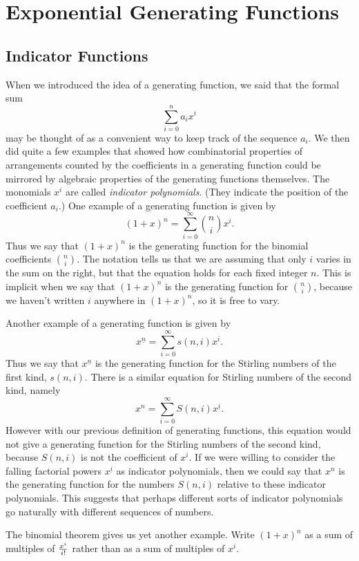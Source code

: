 \chapter{Exponential Generating Functions}\label{expogenfun}
\section{Indicator Functions}
When we introduced the idea of a generating function, we said that the
formal sum
  $$\sum_{i=0}^n a_ix^i$$
may be thought of as a convenient way to keep track of the sequence
$a_i$.  We then did quite a few examples that showed how combinatorial
properties of arrangements counted by the coefficients in a generating
function could be mirrored by algebraic properties of the generating
functions themselves.  The monomials $x^i$ are called {\em indicator
polynomials}.  (They indicate the position of
the coefficient
$a_i$.)  One example of a generating function is given by 
$$(1+x)^n = \sum_{i=0}^\infty {n\choose i}x^i.$$
Thus we say that $(1+x)^n$  is the generating function for the
binomial coefficients $n \choose i$.  The notation tells us that we are
assuming that only $i$ varies in the sum on the right, but that the
equation holds for each fixed integer $n$.  This is implicit when we say
that $(1+x)^n$ is the generating function for $n\choose i$, because we
haven't written $i$ anywhere in $(1+x)^n$, so it is free to vary.

Another example of a generating function is given by
$$x^{\underline{n}} = \sum_{i=0}^\infty s(n,i)x^i.$$
Thus we say that $x^{\underline{n}}$ is the generating function for the
Stirling numbers of the first kind, $s(n,i)$.  There is a similar
equation for Stirling numbers of the second kind, namely
$$x^n = \sum_{i=0}^\infty S(n,i)x^{\underline{i}}.$$
However with our previous definition of generating functions, this
equation would not give a generating function for the Stirling numbers
of the second kind, because $S(n,i)$ is not the coefficient of $x^i$.  If
we were willing to consider the falling factorial powers
$x^{\underline{i}}$ as indicator polynomials, then we could say that
$x^n$ is the generating function for the numbers $S(n,i)$ relative to
these indicator polynomials.  This suggests that perhaps different sorts
of indicator polynomials go naturally with different sequences of
numbers.  

The binomial theorem gives us yet another example. 
\bp
\itemm Write $(1+x)^n$ as a sum of multiples of
$x^i\over i!$ rather than as a sum of multiples of
$x^i$.
\ep

